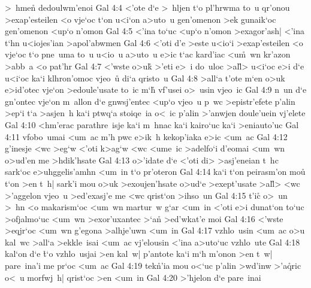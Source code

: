 >~hme\r{n}
dedoulwm'enoi\bibvsend
\vs Gal 4:4
<'ote
d`e
>~hljen
t`o
pl'hrwma
to~u
qr'onou
>exap'esteilen
<o
vje`oc
t`on
u<i`on
a>uto~u
gen'omenon
>ek
gunaik`oc
gen'omenon
<up`o
n'omon\bibvsend
\vs Gal 4:5
<'ina
to`uc
<up`o
n'omon
>exagor'ash|
<'ina
t`hn
u<iojes'ian
>apol'abwmen\bibvsend
\vs Gal 4:6
<'oti
d'e
>este
u<io`i
>exap'esteilen
<o
vje`oc
t`o
pne~uma
to~u
u<io~u
a>uto~u
e>ic
t`ac
kard'iac
<u\r{m}~wn
kr'azon
>abb~a
<o
pat'hr\bibvsend
\vs Gal 4:7
<'wste
o>uk\r{}
>'eti
e>~i
do~uloc
>al\r{l}>
u<i`oc
e>i
d`e
u<i`oc
ka`i
klhron'omoc
vjeo~u\r{}
di`a
qristo~u\bibvsend
\vs Gal 4:8
>all`a
t'ote
m`en
o>uk
e>id'otec
vje`on
>edoule'usate
to~ic
m`h\r{}
vf'usei
o>~usin
vjeo~ic\bibvsend
\vs Gal 4:9
n~un
d`e
gn'ontec
vje`on
m~allon
d`e
gnwsj'entec
<up`o
vjeo~u
p~wc
>epistr'efete
p'alin
>ep`i
t`a
>asjen~h
ka`i
ptwq`a
stoiqe~ia
o<~ic
p'alin
>'anwjen
doule'uein
vj'elete\bibvsend
\vs Gal 4:10
<hm'erac
parathre~isje
ka`i
m~hnac
ka`i
kairo`uc
ka`i
>eniauto'uc\bibvsend
\vs Gal 4:11
vfobo~umai
<um~ac
m'h
pwc
e>ik~h
kekop'iaka
e>ic
<um~ac\bibvsend
\vs Gal 4:12
g'inesje
<wc
>eg`w
<'oti
k>ag`w
<wc
<ume~ic
>adelfo`i
d'eomai
<um~wn
o>ud'en
me
>hdik'hsate\bibvsend
\vs Gal 4:13
o>'idate
d`e
<'oti
di>
>asj'eneian
t~hc
sark`oc
e>uhggelis'amhn
<um~in
t`o
pr'oteron\bibvsend
\vs Gal 4:14
ka`i
t`on
peirasm'on
mou\r{}
t`on
>en
t~h|
sark'i
mou
o>uk
>exoujen'hsate
o>ud`e
>exept'usate
>al\r{l}>
<wc
>'aggelon
vjeo~u
>ed'exasj'e
me
<wc
qrist`on
>ihso~un\bibvsend
\vs Gal 4:15
t'ic\r{}
o>~un
>~hn
<o
makarism`oc
<um~wn
martur~w
g`ar
<um~in
<'oti
e>i
dunat`on
to`uc
>ofjalmo`uc
<um~wn
>exor'uxantec
>`a\r{n}
>ed'wkat'e
moi\bibvsend
\vs Gal 4:16
<'wste
>eqjr`oc
<um~wn
g'egona
>alhje'uwn
<um~in\bibvsend
\vs Gal 4:17
vzhlo~usin
<um~ac
o>u
kal~wc
>all`a
>ekkle~isai
<um~ac
vj'elousin
<'ina
a>uto`uc
vzhlo~ute\bibvsend
\vs Gal 4:18
kal`on
d`e
\r{t}`o
vzhlo~usjai
>en
kal~w|
p'antote
ka`i
m`h
m'onon
>en
t~w|
pare~ina'i
me
pr`oc
<um~ac\bibvsend
\vs Gal 4:19
tek\r{n}'ia
mou
o<`uc
p'alin
>wd'inw
>'a\r{q}ric
o<~u
morfwj~h|
qrist`oc
>en
<um~in\bibvsend
\vs Gal 4:20
>'hjelon
d`e
pare~inai
